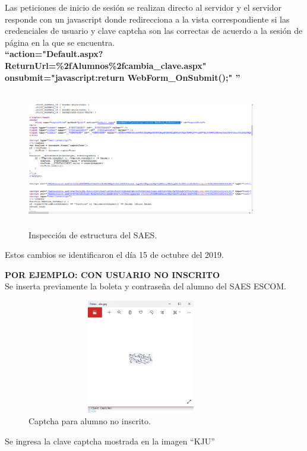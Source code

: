 	\noindent Las peticiones de inicio de sesión se realizan directo al servidor y el servidor responde con un javascript donde redirecciona a la vista correspondiente si las credenciales de usuario y clave captcha son las correctas de acuerdo a la sesión de página en la que se encuentra.\\
	\textbf{“action="Default.aspx?ReturnUrl=\%2fAlumnos\%2fcambia\_clave.aspx" onsubmit="javascript:return WebForm\_OnSubmit();" ”}
	
	\begin{figure} [hbt!]
		\centering
		\includegraphics[width=10cm, height=6cm]{Imagenes/Crawler/ASP1}
		\caption{Inspección de estructura del SAES.}
		\label{asp1}
	\end{figure}
	\noindent Estos cambios se identificaron el día 15 de octubre del 2019.
	\pagebreak
	
	\textbf{POR EJEMPLO: CON USUARIO NO INSCRITO}\\
	\noindent Se inserta previamente la boleta y contraseña del alumno del SAES ESCOM.
	
	\begin{figure}[hbt!]
		\centering
		\includegraphics[width=10cm, height=5cm]{Imagenes/Crawler/ImagenloginNoinscrito}
		\caption{Captcha para alumno no inscrito.}
		\label{imagenloginnoinscrito}
	\end{figure}
	
	Se ingresa la clave captcha mostrada en la imagen “KJU”
	
